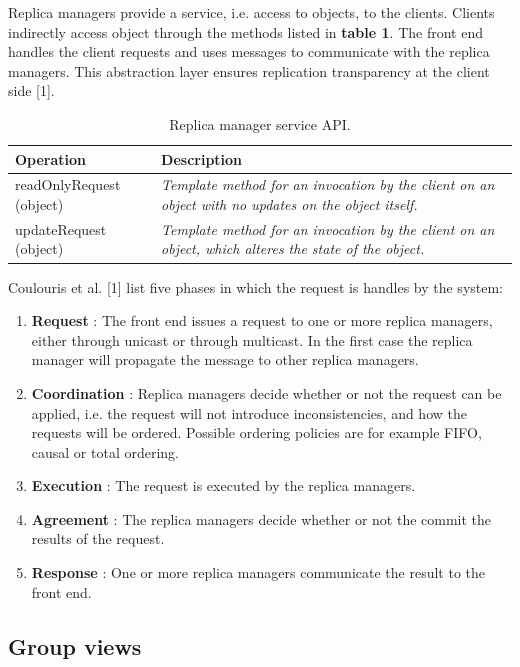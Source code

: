 Replica managers provide a service, i.e. access to objects, to the clients. Clients indirectly access object through the methods listed in \textbf{table 1}. The front end handles the client requests and uses messages to communicate with the replica managers. This abstraction layer ensures replication transparency at the client side [1].


\begin{table}
	\caption{Replica manager service API.}
	\label{tab:api:}
	\begin{tabular}{p{150px} | p{250px}}
		\textbf{Operation} & \textbf{Description} \\
		\hline
		readOnlyRequest (object) & \emph{Template method for an invocation by the client on an object with no updates on the object itself.} \\
		updateRequest (object) & \emph{Template method for an invocation by the client on an object, which alteres the state of the object.} \\
		\hline
	\end{tabular}
\end{table}

Coulouris et al. [1] list five phases in which the request is handles by the system:
\begin{enumerate}
	\item \textbf{Request} : The front end issues a request to one or more replica managers, either through unicast or through multicast. In the first case the replica manager will propagate the message to other replica managers.
	\item \textbf{Coordination} : Replica managers decide whether or not the request can be applied, i.e. the request will not introduce inconsistencies, and how the requests will be ordered. Possible ordering policies are for example FIFO, causal or total ordering.
	\item \textbf{Execution} : The request is executed by the replica managers.
	\item \textbf{Agreement} : The replica managers decide whether or not the commit the results of the request.
	\item \textbf{Response} : One or more replica managers communicate the result to the front end.
\end{enumerate}


\subsection{Group views}


